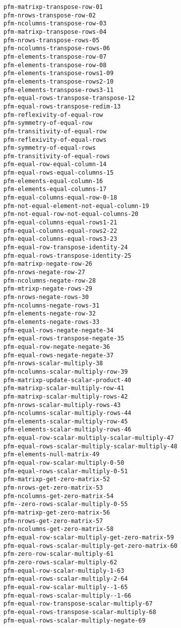 \documentclass[a4paper,10pt]{article}
\begin{document}
\begin{lstlisting}[language=clips]
pfm-matrixp-transpose-row-01
pfm-nrows-transpose-row-02
pfm-ncolumns-transpose-row-03
pfm-matrixp-transpose-rows-04
pfm-nrows-transpose-rows-05
pfm-ncolumns-transpose-rows-06
pfm-elements-transpose-row-07
pfm-elements-transpose-row-08
pfm-elements-transpose-rows1-09
pfm-elements-transpose-rows2-10
pfm-elements-transpose-rows3-11
pfm-equal-rows-transpose-transpose-12
pfm-equal-rows-transpose-redim-13
pfm-reflexivity-of-equal-row
pfm-symmetry-of-equal-row
pfm-transitivity-of-equal-row
pfm-reflexivity-of-equal-rows
pfm-symmetry-of-equal-rows
pfm-transitivity-of-equal-rows
pfm-equal-row-equal-column-14
pfm-equal-rows-equal-columns-15
pfm-elements-equal-column-16
pfm-elements-equal-columns-17
pfm-equal-columns-equal-row-0-18
pfm-not-equal-element-not-equal-column-19
pfm-not-equal-row-not-equal-columns-20
pfm-equal-columns-equal-rows1-21
pfm-equal-columns-equal-rows2-22
pfm-equal-columns-equal-rows3-23
pfm-equal-row-transpose-identity-24
pfm-equal-rows-transpose-identity-25
pfm-matrixp-negate-row-26
pfm-nrows-negate-row-27
pfm-ncolumns-negate-row-28
pfm-mtrixp-negate-rows-29
pfm-nrows-negate-rows-30
pfm-ncolumns-negate-rows-31
pfm-elements-negate-row-32
pfm-elements-negate-rows-33
pfm-equal-rows-negate-negate-34
pfm-equal-rows-transpose-negate-35
pfm-equal-row-negate-negate-36
pfm-equal-rows-negate-negate-37
pfm-nrows-scalar-multiply-38
pfm-ncolumns-scalar-multiply-row-39
pfm-matrixp-update-scalar-product-40
pfm-matrixp-scalar-multiply-row-41
pfm-matrixp-scalar-multiply-rows-42
pfm-nrows-scalar-multiply-rows-43  
pfm-ncolumns-scalar-multiply-rows-44
pfm-elements-scalar-multiply-row-45
pfm-elements-scalar-multiply-rows-46
pfm-equal-row-scalar-multiply-scalar-multiply-47
pfm-equal-rows-scalar-multiply-scalar-multiply-48    
pfm-elements-null-matrix-49
pfm-equal-row-scalar-multiply-0-50
pfm-equal-rows-scalar-multiply-0-51
pfm-matrixp-get-zero-matrix-52
pfm-nrows-get-zero-matrix-53
pfm-ncolumns-get-zero-matrix-54
pfm--zero-rows-scalar-multiply-0-55
pfm-matrixp-get-zero-matrix-56
pfm-nrows-get-zero-matrix-57
pfm-ncolumns-get-zero-matrix-58
pfm-equal-row-scalar-multiply-get-zero-matrix-59
pfm-equal-rows-scalar-multiply-get-zero-matrix-60
pfm-zero-row-scalar-multiply-61
pfm-zero-rows-scalar-multiply-62
pfm-equal-row-scalar-multiply-1-63
pfm-equal-rows-scalar-multiply-2-64
pfm-equal-row-scalar-multiply--1-65
pfm-equal-rows-scalar-multiply--1-66
pfm-equal-row-transpose-scalar-multiply-67
pfm-equal-rows-transpose-scalar-multiply-68
pfm-equal-rows-scalar-multiply-negate-69
\end{lstlisting}
\end{document}
